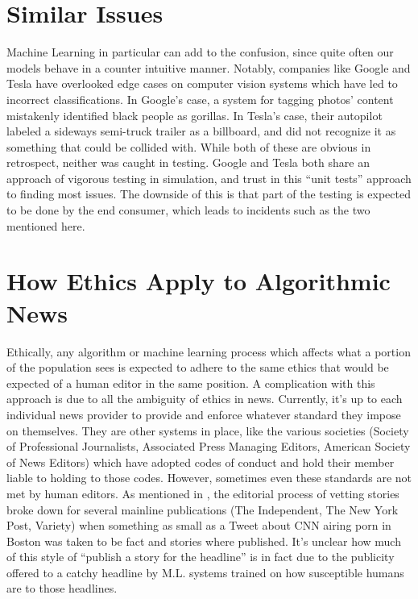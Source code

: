 \documentclass{article}
\begin{document}
\section*{Similar Issues}
Machine Learning in particular can add to the confusion, since quite often our models behave in a counter intuitive manner. Notably, companies like Google and Tesla have overlooked edge cases on computer vision systems which have led to incorrect classifications. In Google's case, a system for tagging photos' content mistakenly identified black people as gorillas. \cite{dougherty_google_????} In Tesla's case, their autopilot labeled a sideways semi-truck trailer as a billboard, and did not recognize it as something that could be collided with. \cite{golson_tesla_2016} While both of these are obvious in retrospect, neither was caught in testing. Google and Tesla both share an approach of vigorous testing in simulation, and trust in this ``unit tests'' approach to finding most issues. The downside of this is that part of the testing is expected to be done by the end consumer, which leads to incidents such as the two mentioned here. \cite{wacker_just_2015}

\section*{How Ethics Apply to Algorithmic News}
Ethically, any algorithm or machine learning process which affects what a portion of the population sees is expected to adhere to the same ethics that would be expected of a human editor in the same position. \cite{npr_npr_????,asne_asne_2016} A complication with this approach is due to all the ambiguity of ethics in news. Currently, it's up to each individual news provider to provide and enforce whatever standard they impose on themselves. They are other systems in place, like the various societies (Society of Professional Journalists, Associated Press Managing Editors, American Society of News Editors) which have adopted codes of conduct and hold their member liable to holding to those codes. \cite{apme_apme_2008,sjp_spj_2014,asne_asne_2016} However, sometimes even these standards are not met by human editors. As mentioned in \citet{grush_cnn_2016}, the editorial process of vetting stories broke down for several mainline publications (The Independent, The New York Post, Variety) when something as small as a Tweet about CNN airing porn in Boston was taken to be fact and stories where published. It's unclear how much of this style of ``publish a story for the headline'' is in fact due to the publicity offered to a catchy headline by M.L. systems trained on how susceptible humans are to those headlines. 
\end{document}

